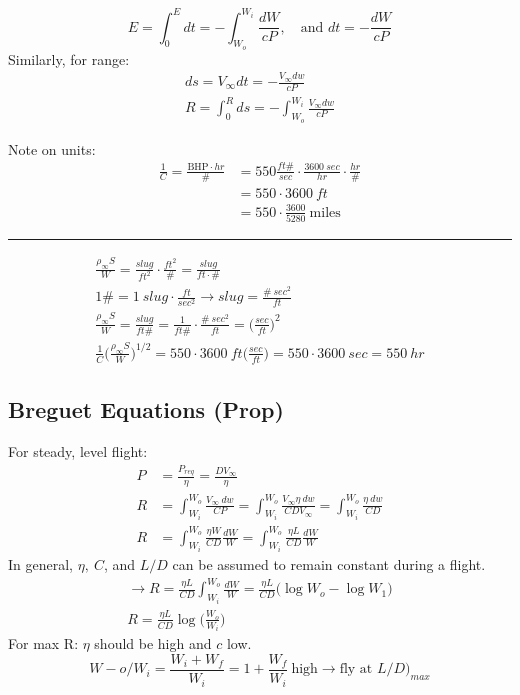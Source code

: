 \documentclass[draft=false, titlepage]{article}
\begin{document}
\begin{equation}
E = \int_0^E dt = -\int_{W_o}^{W_i} \frac{dW}{cP}, \quad \text{and } dt = -\frac{dW}{cP}
\end{equation}
Similarly, for range:
\begin{gather*}
ds = V_\infty dt = -\frac{V_\infty dw}{cP}\\
R = \int_0^R ds = -\int_{W_o}^{W_i} \frac{V_\infty dw}{cP}
\end{gather*}

Note on units:
\begin{align*}
\frac{1}{C} = \frac{\text{BHP}\cdot hr}{\#} &= 550 \frac{ft\#}{sec} \cdot \frac{3600\ sec}{hr}\cdot \frac{hr}{\#}\\
&= 550 \cdot 3600\ ft\\
&= 550 \cdot \frac{3600}{5280}\ \text{miles}
\end{align*}
\hrule

\begin{gather*}
\frac{\rho_\infty S}{W} = \frac{slug}{ft^2} \cdot \frac{ft^2}{\#} = \frac{slug}{ft \cdot \#}\\
1\# = 1\ slug \cdot \frac{ft}{sec^2} \rightarrow slug = \frac{\#\ sec^2}{ft}\\
\frac{\rho_\infty S}{W} = \frac{slug}{ft \#} = \frac{1}{ft \#}\cdot \frac{\#\ sec^2}{ft} = \Big(\frac{sec}{ft}\Big)^2\\
\frac{1}{C} \Big(\frac{\rho_\infty S}{W}\Big)^{1/2} = 550\cdot 3600\ ft \big(\frac{sec}{ft}\big) = 550\cdot 3600\ sec = 550\ hr
\end{gather*}

\subsection{Breguet Equations (Prop)}
For steady, level flight:
\begin{align*}
P &= \frac{P_{req}}{\eta} = \frac{DV_\infty}{\eta}\\R &= \int_{W_i}^{W_o}\frac{V_\infty\ dw}{CP} = \int_{W_i}^{W_o} \frac{V_\infty \eta\ dw}{C D V_\infty} = \int_{W_i}^{W_o} \frac{\eta\ dw}{CD}\\
R &= \int_{W_i}^{W_o} \frac{\eta W}{CD} \frac{dW}{W} = \int_{W_i}^{W_o} \frac{\eta L}{CD} \frac{dW}{W}
\end{align*}
In general, $\eta,\ C$, and $L/D$ can be assumed to remain constant during a flight.
\begin{gather*}
\rightarrow R = \frac{\eta L}{CD} \int_{W_i}^{W_o} \frac{dW}{W} = \frac{\eta L}{CD} \Big(\log W_o - \log W_1\Big)\\
\boxed{R = \frac{\eta L}{CD} \log \Big( \frac{W_o}{W_i} \Big)}
\end{gather*}
For max R: $\eta$ should be high and $c$ low.
\begin{equation*}
W-o/W_i = \frac{W_i + W_f}{W_i} = 1 + \frac{W_f}{W_i}\ \text{high} \rightarrow \text{fly at } L/D\Big)_{max}
\end{equation*}
\end{document}
